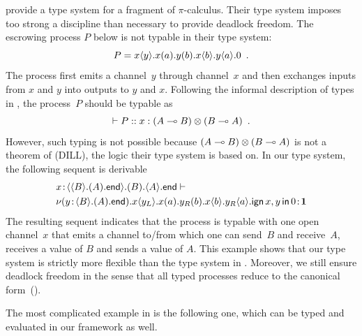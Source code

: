 \citet{pfenning2010} provide a type system for a fragment of $\pi$-calculus.
Their type system imposes too strong a discipline
than necessary to provide deadlock freedom.
The escrowing process $P$ below is not typable in their type
system:
\[
 P = {x}\langle{y}\rangle.{{{x}({a}).{{{y}({b}).{{x}\langle{b}\rangle.{{y}\langle{a}\rangle.{0}}}}}}}\enspace.
\]
The process first emits a channel~$y$ through channel~$x$ and then
exchanges inputs from $x$ and $y$ into outputs to $y$ and $x$.
Following the informal description of types in \citep{pfenning2010},
the process~$P$ should be typable as
\[
 \vdash P::x:(A\multimap B)\otimes(B\multimap A)\enspace.
\]
However, such typing is not possible because $(A\multimap B)\otimes (B\multimap
A)$ is not a theorem of  (DILL), the logic their type system
is based on.
In our type system, the following sequent is derivable
\begin{align*}
&
{x} \mathord{\colon\kern -2pt}{\langle{\langle{B}\rangle.{(A).{\mathsf{end}}}}\rangle.{(B).{\langle{A}\rangle.{\mathsf{end}}}}}
\vdash\\
&{
\nu({y} \mathord{\colon\kern -2pt}{\langle{B}\rangle.{(A).{\mathsf{end}}}}).
{{x}\langle{y_L}\rangle.{{{x}({a}).{{{y_R}({b}).{{x}\langle{b}\rangle.{{y_R}\langle{a}\rangle.{\mathsf{ign }\,{x,y}\,\mathsf{ in }\,{0}}}}}}}}}
} \mathord{\colon\kern -2pt}{\mathbf{1}}
\end{align*}
The resulting sequent indicates that the process is typable with one
open channel~$x$ that emits
a channel to/from which one can send~$B$ and receive~$A$, receives a
value of $B$ and
sends a value of $A$.
This example shows that our type system is strictly more flexible than
the type system in \citet{pfenning2010}.
Moreover, we still ensure deadlock freedom in the sense that all typed
processes reduce to the canonical form~().

The most complicated example in \citet{pfenning2010} is the following
one, which can be typed and evaluated in our framework as well.

